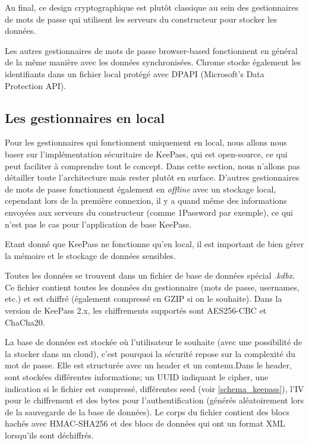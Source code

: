 Au final, ce design cryptographique est plutôt classique au sein des gestionnaires de mots de passe qui utilisent les serveurs du constructeur pour stocker les données.

Les autres gestionnaires de mots de passe browser-based fonctionnent en général de la même manière avec les données synchronisées. Chrome stocke également les identifiants dans un fichier local protégé avec DPAPI (Microsoft's Data Protection API).
\subsection{Les gestionnaires en local}
Pour les gestionnaires qui fonctionnent uniquement en local, nous allons nous baser sur l'implémentation sécuritaire de KeePass, qui est open-source, ce qui peut faciliter à comprendre tout le concept. Dans cette section, nous n'allons pas détailler toute l'architecture mais rester plutôt en surface. D'autres gestionnaires de mots de passe fonctionnent également en \textit{offline} avec un stockage local, cependant lors de la première connexion, il y a quand même des informations envoyées aux serveurs du constructeur (comme 1Password par exemple), ce qui n'est pas le cas pour l'application de base KeePass.

Etant donné que KeePass ne fonctionne qu'en local, il est important de bien gérer la mémoire et le stockage de données sensibles.

Toutes les données se trouvent dans un fichier de base de données spécial \textit{.kdbx}. Ce fichier contient toutes les données du gestionnaire (mots de passe, usernames, etc.) et est chiffré (également compressé en GZIP si on le souhaite). Dans la version de KeePass 2.x, les chiffrements supportés sont AES256-CBC et ChaCha20. 

La base de données est stockée où l'utilisateur le souhaite (avec une possibilité de la stocker dans un cloud), c'est pourquoi la sécurité repose sur la complexité du mot de passe. Elle est structurée avec un header et un contenu\cite{keepassstruct}\cite{keepassieee}.Dans le header, sont stockées différentes informations; un UUID indiquant le cipher, une indication si le fichier est compressé, différentes seed (voir \ref{schema_keepass}), l'IV pour le chiffrement et des bytes pour l'authentification (générés aléatoirement lors de la sauvegarde de la base de données). Le corps du fichier contient des blocs hachés avec HMAC-SHA256 et des blocs de données qui ont un format XML lorsqu'ils sont déchiffrés.

